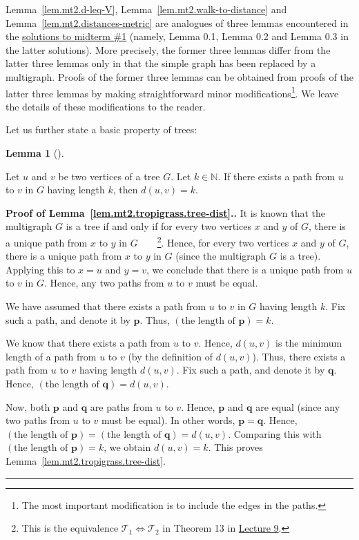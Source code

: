 \documentclass[numbers=enddot,12pt,final,onecolumn,notitlepage]{scrartcl}%
\theoremstyle{definition}
\newtheorem{lem}[theo]{Lemma}
\newenvironment{lemma}[1][]
{\begin{lem}[#1]\begin{leftbar}}
{\end{leftbar}\end{lem}}
\newenvironment{proof}[1][Proof]{\noindent\textbf{#1.} }{\ \rule{0.5em}{0.5em}}
\newcommand{\NN}{\mathbb{N}}
\newcommand{\tup}[1]{\left( #1 \right)}
\begin{document}
Lemma~\ref{lem.mt2.d-leq-V},
Lemma~\ref{lem.mt2.walk-to-distance} and
Lemma~\ref{lem.mt2.distances-metric} are analogues of three
lemmas encountered in the
\href{http://www-users.math.umn.edu/~dgrinber/5707s17/mt1s.pdf}{solutions to midterm \#1}
(namely, Lemma 0.1, Lemma 0.2 and Lemma 0.3 in the latter
solutions).
More precisely, the former three lemmas differ from the
latter three lemmas only in that the simple graph has been
replaced by a multigraph.
Proofs of the former three lemmas can be obtained from
proofs of the latter three lemmas by making straightforward
minor modifications\footnote{The most important
  modification is to include the edges in the paths.}.
We leave the details of these modifications to the reader.

Let us further state a basic property of trees:

\begin{lemma} \label{lem.mt2.tropigrass.tree-dist}
Let $u$ and $v$ be two vertices of a tree $G$.
Let $k \in \NN$.
If there exists a path from $u$ to $v$ in $G$ having
length $k$, then $d \tup{u, v} = k$.
\end{lemma}

\begin{proof}[Proof of Lemma~\ref{lem.mt2.tropigrass.tree-dist}.]
It is known that the multigraph $G$ is a tree if and only
if for every two vertices $x$ and $y$ of $G$, there is a
unique path from $x$ to $y$ in $G$\ \ \ \ \footnote{This
  is the equivalence
  $\mathcal{T}_1 \Longleftrightarrow \mathcal{T}_2$ in
  Theorem 13 in
  \href{http://www-users.math.umn.edu/~dgrinber/5707s17/5707lec9.pdf}{Lecture 9}.}.
Hence, for every two vertices $x$ and $y$ of $G$, there is a
unique path from $x$ to $y$ in $G$
(since the multigraph $G$ is a tree).
Applying this to $x = u$ and $y = v$, we conclude that
there is a unique path from $u$ to $v$ in $G$.
Hence, any two paths from $u$ to $v$ must be equal.

We have assumed that there exists a path from $u$ to $v$
in $G$ having length $k$.
Fix such a path, and denote it by $\mathbf{p}$.
Thus, $\tup{\text{the length of }\mathbf{p}} = k$.

We know that there exists a path from $u$ to $v$.
Hence, $d \tup{u, v}$ is the minimum length of a path from
$u$ to $v$ (by the definition of $d \tup{u, v}$).
Thus, there exists a path from $u$ to $v$ having length
$d \tup{u, v}$.
Fix such a path, and denote it by $\mathbf{q}$.
Hence, $\tup{\text{the length of }\mathbf{q}} = d \tup{u, v}$.

Now, both $\mathbf{p}$ and $\mathbf{q}$ are paths from
$u$ to $v$.
Hence, $\mathbf{p}$ and $\mathbf{q}$ are equal (since
any two paths from $u$ to $v$ must be equal).
In other words, $\mathbf{p} = \mathbf{q}$.
Hence,
$\tup{\text{the length of }\mathbf{p}}
= \tup{\text{the length of }\mathbf{q}} = d \tup{u, v}$.
Comparing this with
$\tup{\text{the length of }\mathbf{p}} = k$, we obtain
$d \tup{u, v} = k$.
This proves Lemma~\ref{lem.mt2.tropigrass.tree-dist}.
\end{proof}
\end{document}
